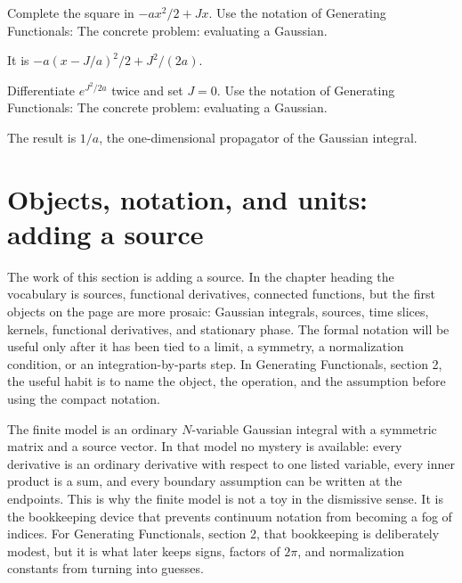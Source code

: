 \begin{exercise}
Complete the square in \(-ax^2/2+Jx\).  Use the notation of Generating Functionals: The concrete problem: evaluating a Gaussian.
\begin{answer}
It is \(-a(x-J/a)^2/2+J^2/(2a)\).
\end{answer}
\end{exercise}

\begin{exercise}
Differentiate \(e^{J^2/2a}\) twice and set \(J=0\).  Use the notation of Generating Functionals: The concrete problem: evaluating a Gaussian.
\begin{answer}
The result is \(1/a\), the one-dimensional propagator of the Gaussian integral.
\end{answer}
\end{exercise}



\section{Objects, notation, and units: adding a source}













The work of this section is adding a source.  In the chapter heading the vocabulary is sources, functional derivatives, connected functions, but the first objects on the page are more prosaic: Gaussian integrals, sources, time slices, kernels, functional derivatives, and stationary phase.  The formal notation will be useful only after it has been tied to a limit, a symmetry, a normalization condition, or an integration-by-parts step.  In Generating Functionals, section 2, the useful habit is to name the object, the operation, and the assumption before using the compact notation.

The finite model is an ordinary \(N\)-variable Gaussian integral with a symmetric matrix and a source vector.  In that model no mystery is available: every derivative is an ordinary derivative with respect to one listed variable, every inner product is a sum, and every boundary assumption can be written at the endpoints.  This is why the finite model is not a toy in the dismissive sense.  It is the bookkeeping device that prevents continuum notation from becoming a fog of indices.  For Generating Functionals, section 2, that bookkeeping is deliberately modest, but it is what later keeps signs, factors of \(2\pi\), and normalization constants from turning into guesses.

